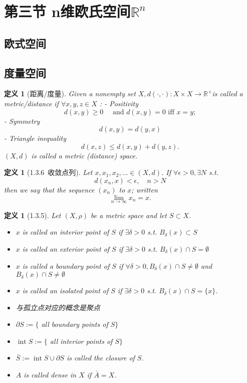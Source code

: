 \documentclass[10pt,openany]{book}
\theoremstyle{thmstyle} %
\theoremstyle{defstyle} %
\newtheorem{definition}[theorem]{定义}
\theoremstyle{prostyle} %
\begin{document}
\section{第三节 n维欧氏空间$\mathbb{R}^n$}

\subsection{欧式空间}

\subsection{度量空间}

\begin{definition}[距离/度量]
Given a nonempty set $X, d(\cdot, \cdot): X \times X \rightarrow \mathbb{R}^{+}$is called a metric/distance if $\forall x, y, z \in X$ :
- Positivity
$$
d(x, y) \geq 0 \quad \text { and } d(x, y)=0 \text { iff } x=y ;
$$
- Symmetry
$$
d(x, y)=d(y, x)
$$
- Triangle inequality
$$
d(x, z) \leq d(x, y)+d(y, z) .
$$
$(X, d)$ is called a metric (distance) space.
\end{definition}


\begin{definition}[1.3.6~收敛点列]
Let $x, x_1, x_2, \ldots \in(X, d)$. If $\forall \epsilon>0, \exists N$ s.t.
$$
d\left(x_n, x\right)<\epsilon, \quad n>N
$$
then we say that the sequence $\left(x_n\right)$ to $x$; written
$$
\lim _{n \rightarrow \infty} x_n=x .
$$
\end{definition}


\begin{definition}[1.3.5]
Let $(X, \rho)$ be a metric space and let $S \subset X$.
\begin{itemize}
    \item $x$ is called an interior point of $S$ if $\exists \delta>0$ s.t. $B_\delta(x) \subset S$
    \item $x$ is called an exterior point of $S$ if $\exists \delta>0$ s.t. $B_\delta(x) \cap S=\emptyset$
    \item $x$ is called a boundary point of $S$ if $\forall \delta>0, B_\delta(x) \cap S \neq \emptyset$ and $B_\delta(x) \cap S \neq \emptyset$
    \item $x$ is called an isolated point of $S$ if $\exists \delta>0$ s.t. $B_\delta(x) \cap S=\{x\}$. 
    \item 与孤立点对应的概念是聚点
    \item $\partial S:=\{$ all boundary points of $S\}$
    \item $\operatorname{int} S:=\{$ all interior points of $S\}$
    \item $\bar{S}:=\operatorname{int} S \cup \partial S$ is called the closure of $S$.
    \item $A$ is called dense in $X$ if $\bar{A}=X$.
\end{itemize}
\end{definition}
\end{document}
